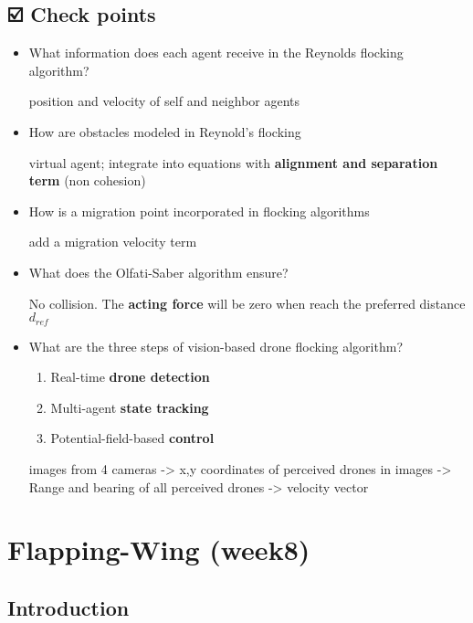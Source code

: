 \documentclass[]{article}
\begin{document}
\subsection{☑️ Check points}\label{header-n1567}

\begin{itemize}
\item
  What information does each agent receive in the Reynolds flocking
  algorithm?

  position and velocity of self and neighbor agents
\item
  How are obstacles modeled in Reynold's flocking

  virtual agent; integrate into equations with \textbf{alignment and
  separation term} (non cohesion)
\item
  How is a migration point incorporated in flocking algorithms

  add a migration velocity term
\item
  What does the Olfati-Saber algorithm ensure?

  No collision. The \textbf{acting force} will be zero when reach the
  preferred distance \(d_{ref}\)
\item
  What are the three steps of vision-based drone flocking algorithm?

  \begin{enumerate}
  \def\labelenumi{\arabic{enumi}.}
  \item
    Real-time \textbf{drone detection}
  \item
    Multi-agent \textbf{state tracking}
  \item
    Potential-field-based \textbf{control}
  \end{enumerate}

  images from 4 cameras -\textgreater{} x,y coordinates of perceived
  drones in images -\textgreater{} Range and bearing of all perceived
  drones -\textgreater{} velocity vector
\end{itemize}

\section{Flapping-Wing (week8)}\label{header-n1591}

\subsection{Introduction}\label{header-n1592}
\end{document}
